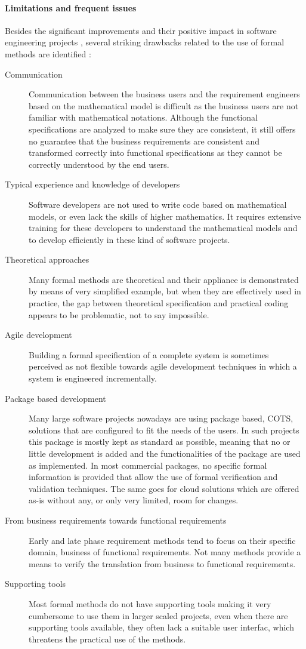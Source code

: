 \paragraph{Limitations and frequent issues}
\label{sec:drawbacks}
Besides the significant improvements and their positive impact in software engineering projects , several striking drawbacks related to the use of formal methods are identified :
\begin{description}
	\item[Communication] Communication between the business users and the requirement engineers based on the mathematical model is difficult as the business users are not familiar with mathematical notations. Although the functional specifications are analyzed to make sure they are consistent, it still offers no guarantee that the business requirements are consistent and transformed correctly into functional specifications as they cannot be correctly understood by the end users.
	\item[Typical experience and knowledge of developers] Software developers are not used to write code based on mathematical models, or even lack the skills of higher mathematics. It requires extensive training for these developers to understand the mathematical models and to develop efficiently in these kind of software projects.
	\item[Theoretical approaches] Many formal methods are theoretical and their appliance is demonstrated by means of very simplified example, but when they are effectively used in practice, the gap between theoretical specification and practical coding appears to be problematic, not to say impossible.
	\item[Agile development] Building a formal specification of a complete system is sometimes perceived as not flexible towards agile development techniques in which a system is engineered incrementally. 
	\item[Package based development] Many large software projects nowadays are using package ba\-sed, COTS, solutions that are configured to fit the needs of the users. In such projects this package is mostly kept as standard as possible, meaning that no or little development is added and the functionalities of the package are used as implemented. In most commercial packages, no specific formal information is provided that allow the use of formal verification and validation techniques. The same goes for cloud solutions which are offered as-is without any, or only very limited, room for changes.
	\item[From business requirements towards functional requirements] Early and late phase requi\-rement methods tend to focus on their specific domain, business of functional requirements.
	Not many methods provide a means to verify the translation from business to functional requirements.
	\item[Supporting tools] Most formal methods do not have supporting tools making it very cumbersome to use them in larger scaled projects, even when there are supporting tools available, they often lack a suitable user interfac, which threatens the practical use of the methods.


\end{description}
